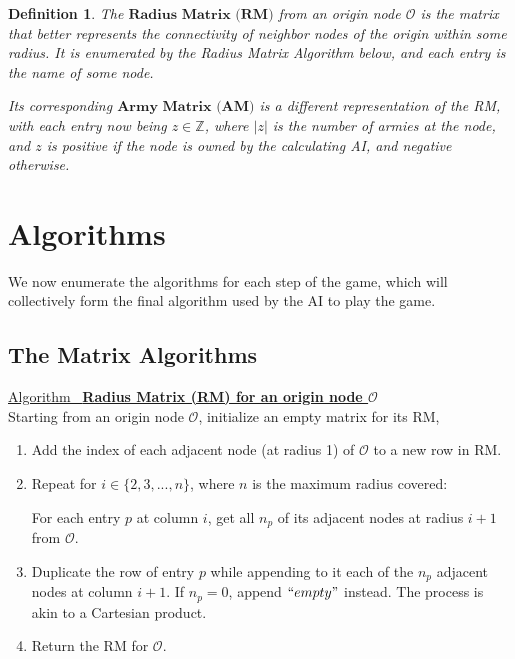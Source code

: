 \documentclass[12pt]{article}  %
\newtheorem{definition}{Definition}
\newcommand{\algtitle}[1]{\underline{Algorithm \ {\bf #1}} \vspace*{1mm}\\}
\begin{document}
\begin{definition} \label{RMAM}
The $\textbf{Radius Matrix (RM)}$ from an origin node $\mathcal{O}$ is the matrix that better represents the connectivity of neighbor nodes of the origin within some radius. It is enumerated by the Radius Matrix Algorithm below, and each entry is the name of some node.

Its corresponding $\textbf{Army Matrix (AM)}$ is a different representation of the RM, with each entry now being $z \in \mathbb{Z}$, where $|z|$ is the number of armies at the node, and $z$ is positive if the node is owned by the calculating AI, and negative otherwise.
\end{definition}







\section{Algorithms}

We now enumerate the algorithms for each step of the game, which will collectively form the final algorithm used by the AI to play the game.


\subsection{The Matrix Algorithms}

\algtitle{Radius Matrix (RM) for an origin node $\mathcal{O}$}
Starting from an origin node $\mathcal{O}$, initialize an empty matrix for its RM,
\begin{enumerate}
	\item Add the index of each adjacent node (at radius 1) of $\mathcal{O}$ to a new row in RM.
	\item Repeat for $i \in \{2,3,...,n\}$, where $n$ is the maximum radius covered:
	
	For each entry $p$ at column $i$, get all $n_p$ of its adjacent nodes at radius $i+1$ from $\mathcal{O}$. 

	\item Duplicate the row of entry $p$ while appending to it each of the $n_p$ adjacent nodes at column $i+1$. If $n_p=0$, append $``empty"$ instead. The process is akin to a Cartesian product.

	\item Return the RM for $\mathcal{O}$.
\end{enumerate}
\end{document}
